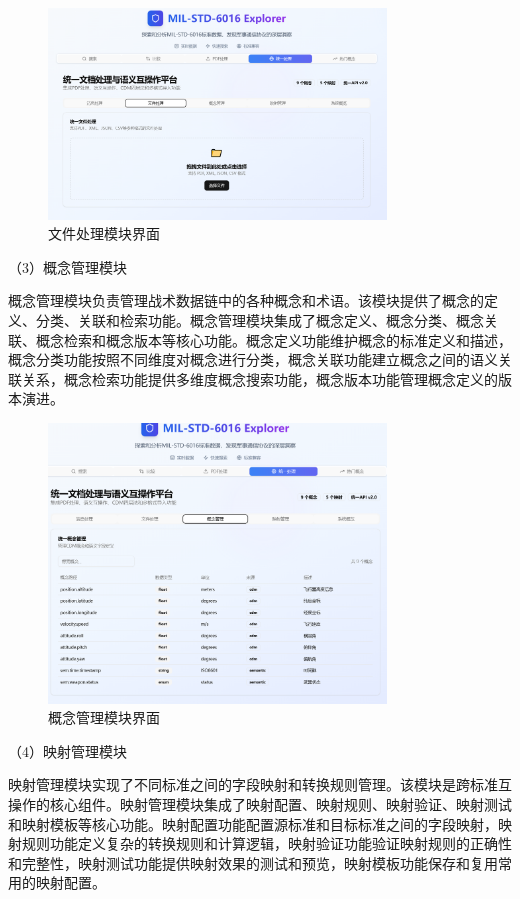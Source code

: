 \begin{figure}[H]
\centering
\includegraphics[width=0.8\textwidth]{chapters/fig-0/front_fileup.png}
\caption{文件处理模块界面}
\label{fig:frontend-file}
\end{figure}

（3）概念管理模块

概念管理模块负责管理战术数据链中的各种概念和术语。该模块提供了概念的定义、分类、关联和检索功能。概念管理模块集成了概念定义、概念分类、概念关联、概念检索和概念版本等核心功能。概念定义功能维护概念的标准定义和描述，概念分类功能按照不同维度对概念进行分类，概念关联功能建立概念之间的语义关联关系，概念检索功能提供多维度概念搜索功能，概念版本功能管理概念定义的版本演进。

\begin{figure}[H]
\centering
\includegraphics[width=0.8\textwidth]{chapters/fig-0/front_concept.png}
\caption{概念管理模块界面}
\label{fig:frontend-concept}
\end{figure}

（4）映射管理模块

映射管理模块实现了不同标准之间的字段映射和转换规则管理。该模块是跨标准互操作的核心组件。映射管理模块集成了映射配置、映射规则、映射验证、映射测试和映射模板等核心功能。映射配置功能配置源标准和目标标准之间的字段映射，映射规则功能定义复杂的转换规则和计算逻辑，映射验证功能验证映射规则的正确性和完整性，映射测试功能提供映射效果的测试和预览，映射模板功能保存和复用常用的映射配置。


